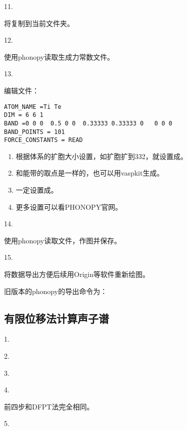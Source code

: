 11.

将复制到当前文件夹。

12.

使用phonopy读取生成力常数文件。

13.

编辑文件：
\begin{lstlisting}[caption=band.conf]
ATOM_NAME =Ti Te
DIM = 6 6 1
BAND =0 0 0  0.5 0 0  0.33333 0.33333 0   0 0 0
BAND_POINTS = 101
FORCE_CONSTANTS = READ
\end{lstlisting}

\begin{enumerate}
    \item {}根据体系的扩胞大小设置，如扩胞扩到332，就设置成。
    \item {}和能带的取点是一样的，也可以用vaspkit生成。
    \item {}一定设置成。
    \item 更多设置可以看PHONOPY官网。
\end{enumerate}

14.

使用phonopy读取文件，作图并保存。

15.

将数据导出方便后续用Origin等软件重新绘图。

\begin{extend}
  旧版本的phonopy的导出命令为：
\end{extend}

\subsection{有限位移法计算声子谱}\label{subsec:具体计算步骤-有限位移法计算声子谱}

1.

2.

3.

4.

前四步和DFPT法完全相同。

5.

